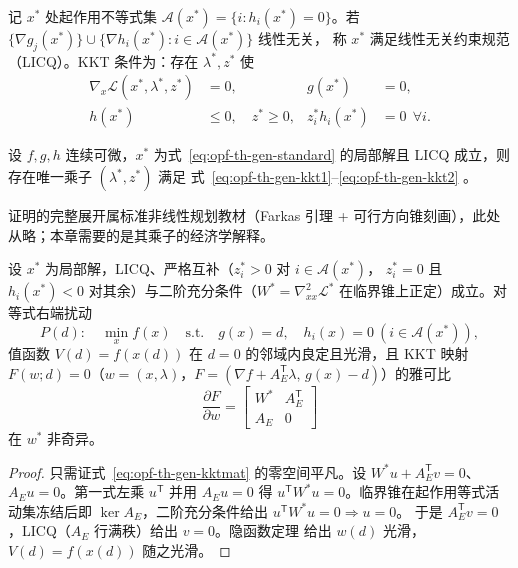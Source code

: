 \begin{definition}\label{def:opf-th-gen-kkt}
记 $x^*$ 处起作用不等式集 $\mathcal A(x^*)=\{i:h_i(x^*)=0\}$。若
$\{\nabla g_j(x^*)\}\cup\{\nabla h_i(x^*):i\in\mathcal A(x^*)\}$ 线性无关，
称 $x^*$ 满足线性无关约束规范（LICQ）。KKT 条件为：存在
$\lambda^*,z^*$ 使
\begin{align}
\nabla_x\mathcal L(x^*,\lambda^*,z^*)&=0,
& g(x^*)&=0,\label{eq:opf-th-gen-kkt1}\\
h(x^*)&\le0,\quad z^*\ge0,
& z_i^*h_i(x^*)&=0\ \ \forall i .
\label{eq:opf-th-gen-kkt2}
\end{align}
\end{definition}

\begin{theorem}\label{thm:opf-th-gen-kkt-nec}
设 $f,g,h$ 连续可微，$x^*$ 为式~\eqref{eq:opf-th-gen-standard} 的局部解且
LICQ 成立，则存在唯一乘子 $(\lambda^*,z^*)$ 满足
式~\eqref{eq:opf-th-gen-kkt1}--\eqref{eq:opf-th-gen-kkt2}
\cite{opft:kuhn-tucker,opft:nocedal-wright,opft:bertsekas-nlp}。
\end{theorem}

证明的完整展开属标准非线性规划教材（Farkas 引理 + 可行方向锥刻画），此处
从略；本章需要的是其乘子的经济学解释。

\begin{lemma}\label{lem:opf-th-gen-ift}
设 $x^*$ 为局部解，LICQ、严格互补（$z_i^*>0$ 对 $i\in\mathcal A(x^*)$，
$z_i^*=0$ 且 $h_i(x^*)<0$ 对其余）与二阶充分条件（$W^*=\nabla^2_{xx}
\mathcal L^*$ 在临界锥上正定）成立。对等式右端扰动
\begin{equation}
P(d):\quad \min_x f(x)\quad\text{s.t.}\quad g(x)=d,\quad
h_i(x)=0\ (i\in\mathcal A(x^*)),
\end{equation}
值函数 $V(d)=f(x(d))$ 在 $d=0$ 的邻域内良定且光滑，且 KKT 映射
$F(w;d)=0$（$w=(x,\lambda)$，$F=(\nabla f+A_E^{\mathsf T}\lambda,\,
g(x)-d)$）的雅可比
\begin{equation}
\frac{\partial F}{\partial w}=
\begin{bmatrix}W^*&A_E^{\mathsf T}\\ A_E&0\end{bmatrix}
\label{eq:opf-th-gen-kktmat}
\end{equation}
在 $w^*$ 非奇异。
\end{lemma}

\begin{proof}
只需证式~\eqref{eq:opf-th-gen-kktmat} 的零空间平凡。设
$W^*u+A_E^{\mathsf T}v=0$、$A_Eu=0$。第一式左乘 $u^{\mathsf T}$ 并用
$A_Eu=0$ 得 $u^{\mathsf T}W^*u=0$。临界锥在起作用等式活动集冻结后即
$\ker A_E$，二阶充分条件给出 $u^{\mathsf T}W^*u=0\Rightarrow u=0$。
于是 $A_E^{\mathsf T}v=0$，LICQ（$A_E$ 行满秩）给出 $v=0$。隐函数定理
给出 $w(d)$ 光滑，$V(d)=f(x(d))$ 随之光滑。
\end{proof}


